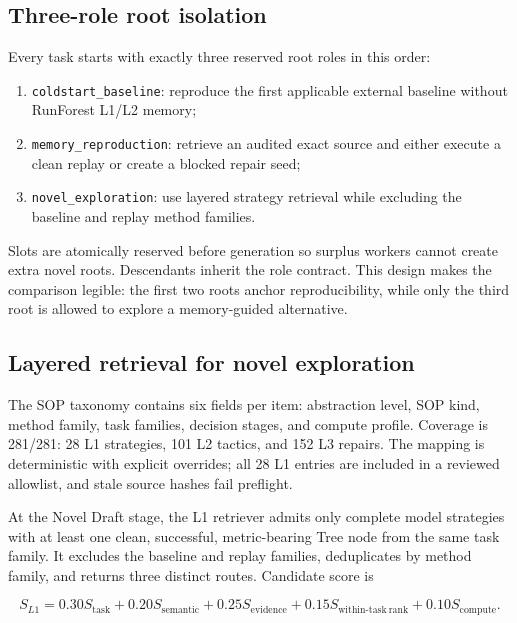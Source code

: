 \documentclass{article}
\begin{document}
\subsection{Three-role root isolation}

Every task starts with exactly three reserved root roles in this order:

\begin{enumerate}[leftmargin=*,itemsep=1pt]
  \item \texttt{coldstart\_baseline}: reproduce the first applicable external
  baseline without RunForest L1/L2 memory;
  \item \texttt{memory\_reproduction}: retrieve an audited exact source and
  either execute a clean replay or create a blocked repair seed;
  \item \texttt{novel\_exploration}: use layered strategy retrieval while
  excluding the baseline and replay method families.
\end{enumerate}

Slots are atomically reserved before generation so surplus workers cannot create
extra novel roots.  Descendants inherit the role contract.  This design makes
the comparison legible: the first two roots anchor reproducibility, while only
the third root is allowed to explore a memory-guided alternative.

\subsection{Layered retrieval for novel exploration}

The SOP taxonomy contains six fields per item: abstraction level, SOP kind,
method family, task families, decision stages, and compute profile.  Coverage is
281/281: 28 L1 strategies, 101 L2 tactics, and 152 L3 repairs.  The mapping is
deterministic with explicit overrides; all 28 L1 entries are included in a
reviewed allowlist, and stale source hashes fail preflight.

At the Novel Draft stage, the L1 retriever admits only complete model strategies
with at least one clean, successful, metric-bearing Tree node from the same task
family.  It excludes the baseline and replay families, deduplicates by method
family, and returns three distinct routes.  Candidate score is

\begin{equation}
S_{L1}=0.30S_{\mathrm{task}}+0.20S_{\mathrm{semantic}}+
0.25S_{\mathrm{evidence}}+0.15S_{\mathrm{within\mbox{-}task\ rank}}+
0.10S_{\mathrm{compute}}.
\end{equation}
\end{document}

